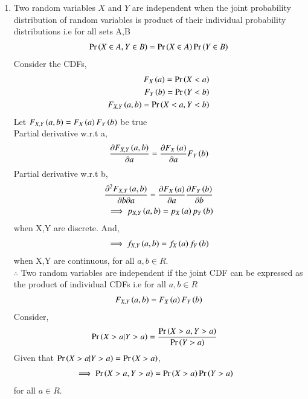 \documentclass[journal,12pt,twocolumn]{IEEEtran}
\begin{document}
\begin{enumerate}
    \item Two random variables $X$ and $Y$ are independent when the joint probability distribution of random variables is product of their individual probability distributions i.e for all sets A,B
    \begin{align}
        \label{eq1} \Pr\left(X\in A,Y \in B\right)=\Pr\left(X \in A\right)\Pr\left(Y \in B\right)
    \end{align}
    Consider the CDFs,
    \begin{align}
        F_X\left(a\right)=\Pr\left(X<a\right)\\
        F_Y\left(b\right)=\Pr\left(Y<b\right)\\
        F_{X,Y}\left(a,b\right)=\Pr\left(X<a,Y<b\right)
    \end{align}
    Let $F_{X,Y}\left(a,b\right)=F_X\left(a\right)F_Y\left(b\right)$ be true\\
    Partial derivative w.r.t a,
    \begin{align}
        \frac{\partial F_{X,Y}\left(a,b\right)}{\partial a}=\frac{\partial F_X\left(a\right) }{\partial a}F_Y\left(b\right)
    \end{align}
    Partial derivative w.r.t b,
    \begin{align}
        \frac{\partial^2 F_{X,Y}\left(a,b\right)}{\partial b \partial a}=\frac{\partial F_X\left(a\right) }{\partial a}\frac{\partial F_Y\left(b\right) }{\partial b} \\
        \implies p_{X,Y}\left(a,b\right)=p_X\left(a\right)p_Y\left(b\right)
    \end{align}
    when X,Y are discrete. And,
    \begin{align}
        \implies f_{X,Y}\left(a,b\right)=f_X\left(a\right)f_Y\left(b\right)
    \end{align}
    when X,Y are continuous, for all $a,b\in R$. \\
    $\therefore$ Two random variables are independent if the joint CDF can be expressed as the product of individual CDFs i.e for all $a,b\in R$
    \begin{align}
       \label{eq1} F_{X,Y}\left(a,b\right)=F_X\left(a\right)F_Y\left(b\right)
    \end{align}
    Consider,
    \begin{align}
      \Pr\left(X>a|Y>a\right)&=\frac{\Pr\left(X>a,Y>a\right)}{\Pr\left(Y>a\right)}
    \end{align}
    Given that $\Pr\left(X>a|Y>a\right)=\Pr\left(X>a\right)$,
    \begin{align}
        \label{eq2}\implies \Pr\left(X>a,Y>a\right)&=\Pr\left(X>a\right)\Pr\left(Y>a\right)
    \end{align}
    for all $a\in R$.
    \begin{multline}

\end{multline}
\end{enumerate}
\end{document}
